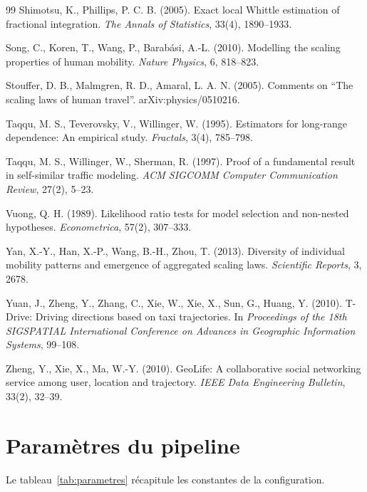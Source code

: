 \begin{thebibliography}{99}
Shimotsu, K., Phillips, P. C. B. (2005).
Exact local Whittle estimation of fractional integration.
\emph{The Annals of Statistics}, 33(4), 1890--1933.

Song, C., Koren, T., Wang, P., Barab\'asi, A.-L. (2010).
Modelling the scaling properties of human mobility.
\emph{Nature Physics}, 6, 818--823.

Stouffer, D. B., Malmgren, R. D., Amaral, L. A. N. (2005).
Comments on ``The scaling laws of human travel''.
arXiv:physics/0510216.

Taqqu, M. S., Teverovsky, V., Willinger, W. (1995).
Estimators for long-range dependence: An empirical study.
\emph{Fractals}, 3(4), 785--798.

Taqqu, M. S., Willinger, W., Sherman, R. (1997).
Proof of a fundamental result in self-similar traffic modeling.
\emph{ACM SIGCOMM Computer Communication Review}, 27(2), 5--23.

Vuong, Q. H. (1989).
Likelihood ratio tests for model selection and non-nested hypotheses.
\emph{Econometrica}, 57(2), 307--333.

Yan, X.-Y., Han, X.-P., Wang, B.-H., Zhou, T. (2013).
Diversity of individual mobility patterns and emergence of aggregated scaling laws.
\emph{Scientific Reports}, 3, 2678.

Yuan, J., Zheng, Y., Zhang, C., Xie, W., Xie, X., Sun, G., Huang, Y. (2010).
T-Drive: Driving directions based on taxi trajectories.
In \emph{Proceedings of the 18th SIGSPATIAL International Conference on Advances in Geographic Information Systems}, 99--108.

Zheng, Y., Xie, X., Ma, W.-Y. (2010).
GeoLife: A collaborative social networking service among user, location and trajectory.
\emph{IEEE Data Engineering Bulletin}, 33(2), 32--39.

\end{thebibliography}

\appendix
\chapter{Paramètres du pipeline}
\label{ann:parametres}
Le tableau~\ref{tab:parametres} récapitule les constantes de la configuration.

